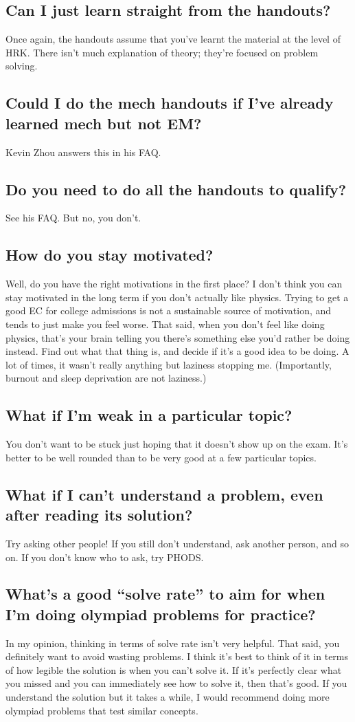\documentclass[11pt]{article}
\begin{document}
\subsection*{Can I just learn straight from the handouts?}
Once again, the handouts assume that you’ve learnt the material at the level of HRK. There isn’t much explanation of theory; they’re focused on problem solving.
\subsection*{Could I do the mech handouts if I’ve already learned mech but not EM?}
Kevin Zhou answers this in his FAQ.
\subsection*{Do you need to do all the handouts to qualify?}
See his FAQ. But no, you don't.
\subsection*{How do you stay motivated?}
Well, do you have the right motivations in the first place? I don’t think you can stay motivated in the long term if you don’t actually like physics. Trying to get a good EC for college admissions is not a sustainable source of motivation, and tends to just make you feel worse.
That said, when you don’t feel like doing physics, that’s your brain telling you there’s something else you’d rather be doing instead. Find out what that thing is, and decide if it’s a good idea to be doing. A lot of times, it wasn’t really anything but laziness stopping me. (Importantly, burnout and sleep deprivation are not laziness.)
\subsection*{What if I’m weak in a particular topic?}
You don’t want to be stuck just hoping that it doesn’t show up on the exam. It’s better to be well rounded than to be very good at a few particular topics. 
\subsection*{What if I can’t understand a problem, even after reading its solution?}
Try asking other people! If you still don’t understand, ask another person, and so on. If you don’t know who to ask, try PHODS.
\subsection*{What’s a good “solve rate” to aim for when I’m doing olympiad problems for practice?}
In my opinion, thinking in terms of solve rate isn’t very helpful. That said, you definitely want to avoid wasting problems. I think it’s best to think of it in terms of how legible the solution is when you can’t solve it. If it’s perfectly clear what you missed and you can immediately see how to solve it, then that’s good. If you understand the solution but it takes a while, I would recommend doing more olympiad problems that test similar concepts. 
\end{document}
